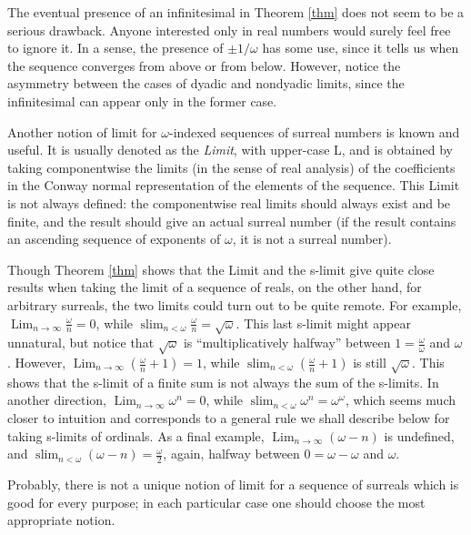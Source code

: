 \documentclass[12pt]{amsart}
\theoremstyle{definition}
\theoremstyle{remark}
\begin{document}
The eventual presence  of an infinitesimal in
Theorem \ref{thm} does not seem to 
be a serious drawback.
Anyone  interested only in
real numbers would surely feel free to ignore it.
In a sense, the presence of  $\pm 1/ \omega $ has some use,
since it tells us when the sequence converges from above or from below.
However, notice the asymmetry between the cases of dyadic  and nondyadic
limits, since the infinitesimal can appear only in the former case.

Another notion of limit
for $ \omega$-indexed sequences of surreal numbers
is known and useful. It is usually denoted as the \emph{Limit},
with upper-case L, and is obtained by taking componentwise the
limits (in the sense of real analysis)
 of the coefficients in the Conway normal
representation of the elements of the sequence.
This Limit is not always defined:
 the componentwise real limits should
always exist and be finite, and the result should
give an actual surreal number
(if the result contains an ascending 
sequence of exponents of $ \omega$, 
it is not a surreal number).

Though Theorem \ref{thm} shows that 
the Limit and the s-limit give quite close
results when taking the limit of
a sequence of reals, on the other hand,
for arbitrary surreals, the two limits could turn out to be
quite remote.
For example, $\operatorname{Lim}_{n\to\infty}   \frac{ \omega}{n} = 0 $,
while $\operatorname{slim}_{n < \omega } \frac{ \omega}{n} = \sqrt{ \omega } $.
This last s-limit
might appear unnatural, but notice that 
$\sqrt{ \omega }$ is ``multiplicatively  halfway'' 
between $1=  \frac{ \omega}{ \omega }$ 
and $ \omega$.
However, $\operatorname{Lim}_{n\to\infty}   (\frac{ \omega}{n}+1) = 1 $,
while $\operatorname{slim}_{n < \omega } (\frac{ \omega}{n} +1) $ is still 
$  \sqrt{ \omega } $. This shows that 
the s-limit of a finite sum is not always
the sum of the s-limits.
In another direction,
$\operatorname{Lim}_{n\to\infty}    \omega^n = 0 $,
while
 $\operatorname{slim}_{n < \omega }   \omega^n = \omega ^ \omega  $,
which seems much closer to intuition and corresponds
to a general rule we shall describe 
below for taking s-limits of ordinals.
As a final example, 
$\operatorname{Lim}_{n\to\infty}   ( \omega - n ) $ is undefined,
and
 $\operatorname{slim}_{n < \omega }   (\omega - n) =   \frac{ \omega}{ 2} $,
again, halfway between $0= \omega - \omega $ and $ \omega$. 

Probably, there is not a unique notion of limit for a sequence of surreals
which is good
for every purpose; in each particular case one should choose the 
most appropriate
notion.
\end{document}
